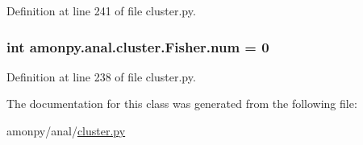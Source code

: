Definition at line 241 of file cluster.\-py.

\hypertarget{classamonpy_1_1anal_1_1cluster_1_1_fisher_a2c44a65df3f24bc786522df8d5aa2db7}{
\subsubsection[{num}]{\setlength{\rightskip}{0pt plus 5cm}int amonpy.\-anal.\-cluster.\-Fisher.\-num = 0\hspace{0.3cm}{\ttfamily [static]}}}\label{classamonpy_1_1anal_1_1cluster_1_1_fisher_a2c44a65df3f24bc786522df8d5aa2db7}


Definition at line 238 of file cluster.\-py.



The documentation for this class was generated from the following file\-:\begin{DoxyCompactItemize}
\item 
amonpy/anal/\hyperlink{cluster_8py}{cluster.\-py}\end{DoxyCompactItemize}
